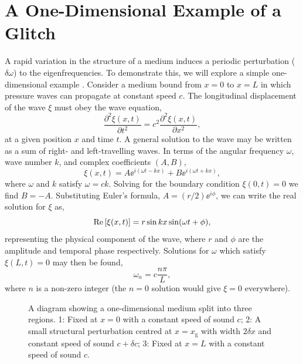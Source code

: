\section[1D Glitch Example]{A One-Dimensional Example of a Glitch}\label{sec:1d-glitch}

\newcommand*{\glitch}{\ensuremath{{\mathrm{g}}}}

A rapid variation in the structure of a medium induces a periodic perturbation (\(\delta\omega\)) to the eigenfrequencies. To demonstrate this, we will explore a simple one-dimensional example \citep[e.g][]{Verner2005}. Consider a medium bound from \(x=0\) to \(x=L\) in which pressure waves can propagate at constant speed \(c\). The longitudinal displacement of the wave \(\xi\) must obey the wave equation,
%
\begin{equation}
    \frac{\partial^2\xi(x, t)}{\partial t^2} = c^2 \frac{\partial^2\xi(x, t)}{\partial x^2},
\end{equation}
%
at a given position \(x\) and time \(t\). A general solution to the wave may be written as a sum of right- and left-travelling waves. In terms of the angular frequency \(\omega\), wave number \(k\), and complex coefficients \((A, B)\),
%
\begin{equation}
    \xi(x, t) = A \ee^{i (\omega t - k x)} + B \ee^{i (\omega t + k x)},
\end{equation}
%
where \(\omega\) and \(k\) satisfy \(\omega = c k\). Solving for the boundary condition \(\xi(0, t) = 0\) we find \(B = - A\). Substituting Euler's formula, \(A = (r/2) \ee^{i\phi}\), we can write the real solution for \(\xi\) as,
%
\begin{equation}
    {\mathrm{Re}}\left[\xi(x, t)\right] = r \sin k x \sin(\omega t + \phi),
\end{equation}
%
representing the physical component of the wave, where \(r\) and \(\phi\) are the amplitude and temporal phase respectively. Solutions for \(\omega\) which satisfy \(\xi(L, t)=0\) may then be found,
%
\begin{equation}
    \omega_n = c \frac{n \pi}{L}, \label{eq:omega-n}
\end{equation}
%
where \(n\) is a non-zero integer (the \(n=0\) solution would give \(\xi=0\) everywhere).

\begin{figure}[!tb]
    \centering
    
    \caption[A diagram showing a one-dimensional medium with a small structural perturbation.]{A diagram showing a one-dimensional medium split into three regions. 1: Fixed at \(x=0\) with a constant speed of sound \(c\); 2: A small structural perturbation centred at \(x=x_\glitch\) with width \(2\delta x\) and constant speed of sound \(c + \delta c\); 3: Fixed at \(x=L\) with a constant speed of sound \(c\).}
    \label{fig:1d-diagram}
\end{figure}

